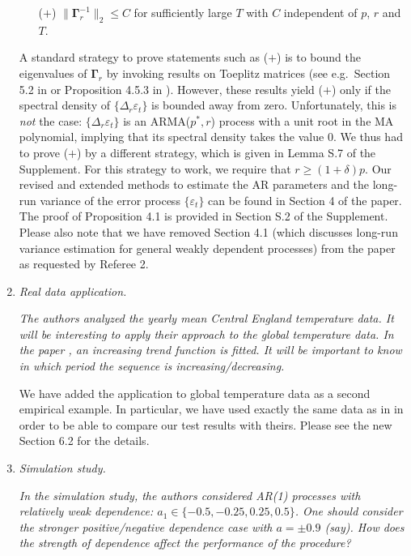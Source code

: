 \documentclass[a4paper,12pt]{article}
\begin{document}
\begin{enumerate}[label=(\arabic*),leftmargin=0.7cm]
\begin{itemize}[leftmargin=0.8cm]
\item[($+$)] $\| \boldsymbol{\Gamma}_r^{-1} \|_2 \le C$ for sufficiently large $T$ with $C$ independent of $p$, $r$ and $T$. 
\end{itemize}
A standard strategy to prove statements such as ($+$) is to bound the eigenvalues of $\boldsymbol{\Gamma}_r$ by invoking results on Toeplitz matrices (see e.g.\ Section 5.2 in \cite{GrenanderSzego1958} or Proposition 4.5.3 in \cite{BrockwellDavis1991}). However, these results yield ($+$) only if the spectral density of $\{\Delta_r \varepsilon_t\}$ is bounded away from zero. Unfortunately, this is \textit{not} the case: $\{\Delta_r \varepsilon_t\}$ is an ARMA($p^*, r$) process with a unit root in the MA polynomial, implying that its spectral density takes the value $0$. We thus had to prove ($+$) by a different strategy, which is given in Lemma S.7 of the Supplement. For this strategy to work, we require that $r \ge (1+\delta) p$. \newline
%
Our revised and extended methods to estimate the AR parameters and the long-run variance of the error process $\{\varepsilon_t\}$  can be found in Section 4 of the paper. The proof of Proposition 4.1 is provided in Section S.2 of the Supplement. Please also note that we have removed Section 4.1 (which discusses long-run variance estimation for general weakly dependent processes) from the paper as requested by Referee 2. 


\item \textit{Real data application.}

\textit{The authors analyzed the yearly mean Central England temperature data. It will be interesting to apply their approach to the global temperature data. In the paper \cite{WuWoodroofeMentz2001}, an increasing trend function is fitted. It will be important to know in which period the sequence is increasing/decreasing.}

We have added the application to global temperature data as a second empirical example. In particular, we have used exactly the same data as in \cite{WuWoodroofeMentz2001} in order to be able to compare our test results with theirs. Please see the new Section 6.2 for the details.


\item \textit{Simulation study.}

\textit{In the simulation study, the authors considered AR(1) processes with relatively weak dependence: $a_1 \in \{-0.5, -0.25, 0.25, 0.5\}$. One should consider the stronger positive/negative dependence case with $a = \pm 0.9$ (say). How does the strength of dependence affect the performance of the procedure?}


\end{enumerate}
\end{document}
